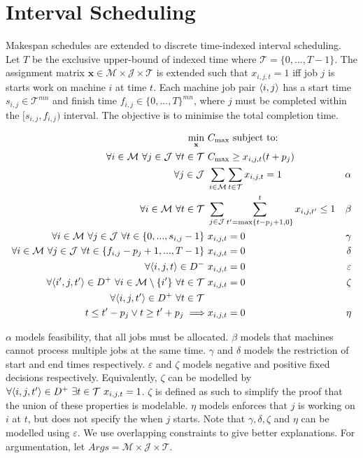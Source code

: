 \section{Interval Scheduling}

Makespan schedules are extended to discrete time-indexed interval scheduling. Let $T$ be the exclusive upper-bound of indexed time where $\mathcal{T}=\{0,...,T-1\}$. The assignment matrix $\mathbf{x}\in\mathcal{M}\times\mathcal{J}\times\mathcal{T}$ is extended such that $x_{i,j,t}=1$ iff job $j$ is starts work on machine $i$ at time $t$. Each machine job pair $\langle{i},{j}\rangle$ has a start time $s_{i,j}\in\mathcal{T}^{mn}$ and finish time $f_{i,j}\in\{0,...,T\}^{mn}$, where $j$ must be completed within the $[s_{i,j},f_{i,j})$ interval. The objective is to minimise the total completion time.

\begin{align*}
	\min_{\mathbf{x}}\ &C_{\max}\text{ subject to:}\\
	\forall i\in\mathcal{M}\ \forall j\in\mathcal{J}\ \forall t\in\mathcal{T}\ &C_{\max}\geq x_{i,j,t}(t+p_j)\\
	\forall j\in\mathcal{J}\ &\sum_{i\in\mathcal{M}}\sum_{t\in\mathcal{T}}x_{i,j,t}=1&\alpha\\
	\forall i\in\mathcal{M}\ \forall t\in\mathcal{T}\ &\sum_{j\in\mathcal{J}}\sum_{t'=\max\{t-p_j+1,0\}}^t x_{i,j,t'}\leq 1&\beta\\
	\forall i\in\mathcal{M}\ \forall j\in\mathcal{J}\ \forall t\in\{0,...,s_{i,j}-1\}\ &x_{i,j,t}=0&\gamma\\
	\forall i\in\mathcal{M}\ \forall j\in\mathcal{J}\ \forall t\in\{f_{i,j}-p_j+1,...,T-1\}\ &x_{i,j,t}=0&\delta\\
	\forall\triple{i}{j}{t}\in D^-\ &x_{i,j,t}=0&\varepsilon\\
	\forall\triple{i'}{j}{t'}\in D^+\ \forall i\in\mathcal{M}\setminus\{i'\}\ \forall t\in\mathcal{T}\ &x_{i,j,t}=0&\zeta\\
	\forall\triple{i}{j}{t'}\in D^+\ \forall t\in\mathcal{T}\ &&\\
	t\leq t'-p_j\lor t\geq t'+p_j\implies&x_{i,j,t}=0&\eta\\
\end{align*}

$\alpha$ models feasibility, that all jobs must be allocated. $\beta$ models that machines cannot process multiple jobs at the same time. $\gamma$ and $\delta$ models the restriction of start and end times respectively. $\varepsilon$ and $\zeta$ models negative and positive fixed decisions respectively. Equivalently, $\zeta$ can be modelled by $\forall\langle{i},{j},{t'}\rangle\in D^+\ \exists t\in\mathcal{T}\ x_{i,j,t}=1$. $\zeta$ is defined as such to simplify the proof that the union of these properties is modelable. $\eta$ models enforces that $j$ is working on $i$ at $t$, but does not specify the when $j$ starts. Note that $\gamma,\delta,\zeta$ and $\eta$ can be modelled using $\varepsilon$. We use overlapping constraints to give better explanations. For argumentation, let $Args=\mathcal{M}\times\mathcal{J}\times\mathcal{T}$.

